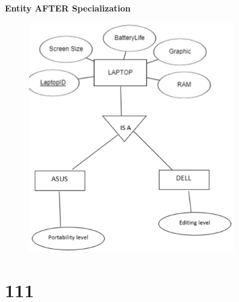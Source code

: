 \documentclass[a4paper, 12pt]{article}
\begin{document}
       \textbf{Entity AFTER Specialization} %
       \begin{figure}[H]
        \includegraphics[width=0.8\textwidth]{chapter2c_7.png}
       \end{figure}

\newpage
\section{111}

    
\end{document}

